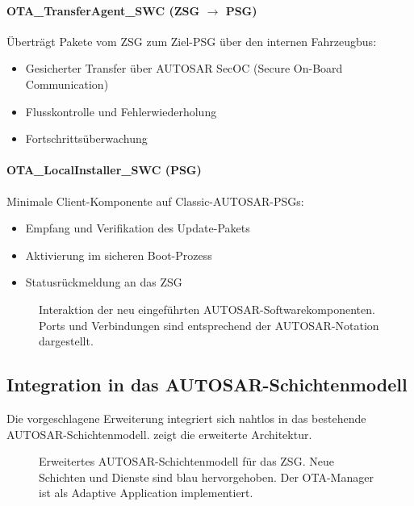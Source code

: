 ﻿\documentclass[12pt,a4paper,twoside]{article}
\begin{document}
\paragraph{OTA\_TransferAgent\_SWC (ZSG $\rightarrow$ PSG)}
Überträgt Pakete vom ZSG zum Ziel-PSG über den internen Fahrzeugbus:
\begin{itemize}
  \item Gesicherter Transfer über AUTOSAR SecOC (Secure On-Board Communication)
  \item Flusskontrolle und Fehlerwiederholung
  \item Fortschrittsüberwachung
\end{itemize}

\paragraph{OTA\_LocalInstaller\_SWC (PSG)}
Minimale Client-Komponente auf Classic-AUTO\-SAR-PSGs:
\begin{itemize}
  \item Empfang und Verifikation des Update-Pakets
  \item Aktivierung im sicheren Boot-Prozess
  \item Statusrückmeldung an das ZSG
\end{itemize}

\begin{figure}[h!]
  \centering
  
  \caption{Interaktion der neu eingeführten AUTOSAR-Softwarekomponenten.
    Ports und Verbindungen sind entsprechend der AUTOSAR-Notation dargestellt.}
  \label{fig:swc_interaction}
\end{figure}

\subsection{Integration in das AUTOSAR-Schichtenmodell}
\label{subsec:schichtenmodell}

Die vorgeschlagene Erweiterung integriert sich nahtlos in das bestehende
AUTO\-SAR-Schichtenmodell.  zeigt die erweiterte
Architektur.

\begin{figure}[h!]
  \centering
  
  \caption{Erweitertes AUTOSAR-Schichtenmodell für das ZSG.
    Neue Schichten und Dienste sind blau hervorgehoben.
    Der OTA-Manager ist als Adaptive Application implementiert.}
  \label{fig:autosar_extended}
\end{figure}
\end{document}
